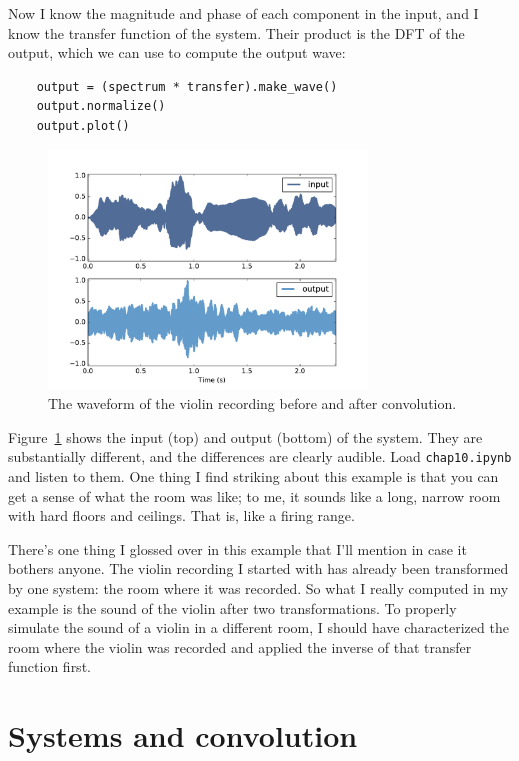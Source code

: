 \documentclass[12pt]{book}
\begin{document}
Now I know the magnitude and phase of each component in the
input, and I know the transfer function of the system.  Their
product is the DFT of the output, which we can use to compute the
output wave:

\begin{verbatim}
    output = (spectrum * transfer).make_wave()
    output.normalize()
    output.plot()
\end{verbatim}

\begin{figure}
\centerline{\includegraphics[height=2.5in]{figs/systems7.pdf}}
\caption{The waveform of the violin recording before and after convolution.}
\label{fig.systems7}
\end{figure}

Figure~\ref{fig.systems7} shows the input (top) and output (bottom) of
the system.  They are substantially different, and the differences are
clearly audible.  Load {\tt chap10.ipynb} and listen to them.  One
thing I find striking about this example is that you can get a sense
of what the room was like; to me, it sounds like a long, narrow room
with hard floors and ceilings.  That is, like a firing range.

There's one thing I glossed over in this example that I'll mention
in case it bothers anyone.  The violin recording I started with
has already been transformed by one system: the room where it was
recorded.  So what I really computed in my example is the sound
of the violin after two transformations.  To properly simulate
the sound of a violin in a different room, I should have characterized
the room where the violin was recorded and applied the inverse
of that transfer function first.


\section{Systems and convolution}
\label{sysconv}
\end{document}
